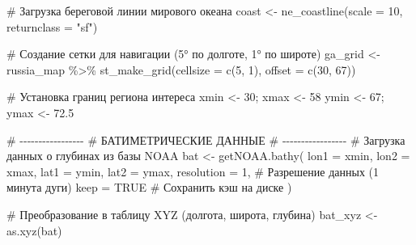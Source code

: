 \documentclass[
  letterpaper,
  DIV=11,
  numbers=noendperiod]{scrreprt}
\newenvironment{Shaded}{\begin{snugshade}}{\end{snugshade}}
\newcommand{\AttributeTok}[1]{\textcolor[rgb]{0.40,0.45,0.13}{#1}}
\newcommand{\CommentTok}[1]{\textcolor[rgb]{0.37,0.37,0.37}{#1}}
\newcommand{\ConstantTok}[1]{\textcolor[rgb]{0.56,0.35,0.01}{#1}}
\newcommand{\DecValTok}[1]{\textcolor[rgb]{0.68,0.00,0.00}{#1}}
\newcommand{\FloatTok}[1]{\textcolor[rgb]{0.68,0.00,0.00}{#1}}
\newcommand{\FunctionTok}[1]{\textcolor[rgb]{0.28,0.35,0.67}{#1}}
\newcommand{\NormalTok}[1]{\textcolor[rgb]{0.00,0.23,0.31}{#1}}
\newcommand{\OtherTok}[1]{\textcolor[rgb]{0.00,0.23,0.31}{#1}}
\newcommand{\SpecialCharTok}[1]{\textcolor[rgb]{0.37,0.37,0.37}{#1}}
\newcommand{\StringTok}[1]{\textcolor[rgb]{0.13,0.47,0.30}{#1}}
\begin{document}
\begin{Shaded}
\begin{Highlighting}[]
\CommentTok{\# Загрузка береговой линии мирового океана}
\NormalTok{coast }\OtherTok{\textless{}{-}} \FunctionTok{ne\_coastline}\NormalTok{(}\AttributeTok{scale =} \DecValTok{10}\NormalTok{, }\AttributeTok{returnclass =} \StringTok{"sf"}\NormalTok{)}

\CommentTok{\# Создание сетки для навигации (5° по долготе, 1° по широте)}
\NormalTok{ga\_grid }\OtherTok{\textless{}{-}}\NormalTok{ russia\_map }\SpecialCharTok{\%\textgreater{}\%} 
  \FunctionTok{st\_make\_grid}\NormalTok{(}\AttributeTok{cellsize =} \FunctionTok{c}\NormalTok{(}\DecValTok{5}\NormalTok{, }\DecValTok{1}\NormalTok{), }\AttributeTok{offset =} \FunctionTok{c}\NormalTok{(}\DecValTok{30}\NormalTok{, }\DecValTok{67}\NormalTok{))}

\CommentTok{\# Установка границ региона интереса}
\NormalTok{xmin }\OtherTok{\textless{}{-}} \DecValTok{30}\NormalTok{; xmax }\OtherTok{\textless{}{-}} \DecValTok{58}
\NormalTok{ymin }\OtherTok{\textless{}{-}} \DecValTok{67}\NormalTok{; ymax }\OtherTok{\textless{}{-}} \FloatTok{72.5}

\CommentTok{\# {-}{-}{-}{-}{-}{-}{-}{-}{-}{-}{-}{-}{-}{-}{-}{-}{-}}
\CommentTok{\# БАТИМЕТРИЧЕСКИЕ ДАННЫЕ}
\CommentTok{\# {-}{-}{-}{-}{-}{-}{-}{-}{-}{-}{-}{-}{-}{-}{-}{-}{-}}
\CommentTok{\# Загрузка данных о глубинах из базы NOAA}
\NormalTok{bat }\OtherTok{\textless{}{-}} \FunctionTok{getNOAA.bathy}\NormalTok{(}
  \AttributeTok{lon1 =}\NormalTok{ xmin, }\AttributeTok{lon2 =}\NormalTok{ xmax,}
  \AttributeTok{lat1 =}\NormalTok{ ymin, }\AttributeTok{lat2 =}\NormalTok{ ymax,}
  \AttributeTok{resolution =} \DecValTok{1}\NormalTok{,   }\CommentTok{\# Разрешение данных (1 минута дуги)}
  \AttributeTok{keep =} \ConstantTok{TRUE}       \CommentTok{\# Сохранить кэш на диске}
\NormalTok{)}

\CommentTok{\# Преобразование в таблицу XYZ (долгота, широта, глубина)}
\NormalTok{bat\_xyz }\OtherTok{\textless{}{-}} \FunctionTok{as.xyz}\NormalTok{(bat)}


\end{Highlighting}
\end{Shaded}
\end{document}
